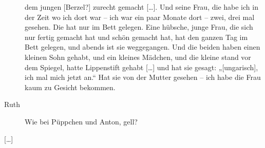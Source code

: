 \documentclass[ngerman,]{article}
\begin{document}
\begin{multicols}{3}
\begin{description}
dem jungen {[}Berzel?{]} zurecht gemacht {[}\ldots{}{]}. Und seine Frau,
die habe ich in der Zeit wo ich dort war – ich war ein paar Monate dort
– zwei, drei mal gesehen. Die hat nur im Bett gelegen. Eine hübsche,
junge Frau, die sich nur fertig gemacht hat und schön gemacht hat, hat
den ganzen Tag im Bett gelegen, und abends ist sie weggegangen. Und die
beiden haben einen kleinen Sohn gehabt, und ein kleines Mädchen, und die
kleine stand vor dem Spiegel, hatte Lippenstift gehabt {[}\ldots{}{]}
und hat sie gesagt: „{[}ungarisch{]}, ich mal mich jetzt an.“ Hat sie
von der Mutter gesehen – ich habe die Frau kaum zu Gesicht bekommen.
\item[Ruth]
Wie bei Püppchen und Anton, gell?
\end{description}

{[}\ldots{}{]}


\end{multicols}
\end{document}
